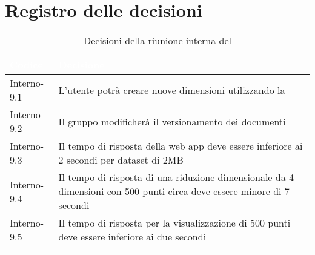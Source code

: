 \section{Registro delle decisioni}
{
\renewcommand{\arraystretch}{1.5}
\centering
\begin{longtable}{C{3cm} C{9cm}}
\textcolor{white}{\textbf{Codice}}&
\textcolor{white}{\textbf{Decisione}}\\	

\endhead
		
Interno-9.1 & L'utente potrà creare nuove dimensioni utilizzando la \textit{}\\
Interno-9.2 & Il gruppo modificherà il versionamento dei documenti\\
Interno-9.3 & Il tempo di risposta della web app deve essere inferiore ai 2 secondi per dataset di 2MB\\
Interno-9.4 & Il tempo di risposta di una riduzione dimensionale da 4 dimensioni con 500 punti circa deve essere minore di 7 secondi\\
Interno-9.5 & Il tempo di risposta per la visualizzazione di 500 punti deve essere inferiore ai due secondi\\

\caption{Decisioni della riunione interna del \Data{}}
\end{longtable}
}

